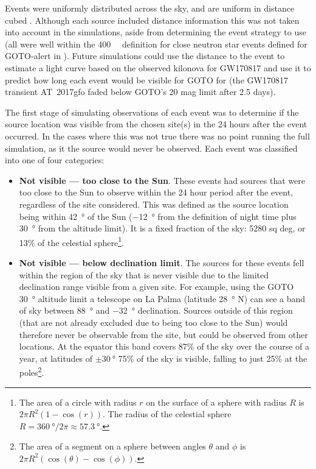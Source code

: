 \begin{colsection}
Events were uniformly distributed across the sky, and are uniform in distance cubed \citep{First2Years}. Although each source included distance information this was not taken into account in the simulations, aside from determining the event strategy to use (all were well within the \SI{400}{\mega\parsec} definition for close neutron star events defined for GOTO-alert in ). Future simulations could use the distance to the event to estimate a light curve based on the observed kilonova for GW170817 \citep{GW170817_followup} and use it to predict how long each event would be visible for GOTO for (the GW170817 transient AT~2017gfo faded below GOTO's 20 mag limit after 2.5 days).

\newpage

The first stage of simulating observations of each event was to determine if the source location was visible from the chosen site(s) in the 24 hours after the event occurred. In the cases where this was not true there was no point running the full simulation, as it the source would never be observed. Each event was classified into one of four categories: %

\begin{itemize}
    \item \textbf{Not visible --- too close to the Sun}. These events had sources that were too close to the Sun to observe within the 24 hour period after the event, regardless of the site considered. This was defined as the source location being within \SI{42}{\degree} of the Sun (\SI{-12}{\degree} from the definition of night time plus \SI{30}{\degree} from the altitude limit). It is a fixed fraction of the sky: 5280 sq deg, or 13\% of the celestial sphere\footnote{The area of a circle with radius $r$ on the surface of a sphere with radius $R$ is $2\pi R^2(1-\cos(r))$. The radius of the celestial sphere $R=\SI{360}{\degree}/2\pi \approx \SI{57.3}{\degree}$.}.

    \item \textbf{Not visible --- below declination limit}. The sources for these events fell within the region of the sky that is never visible due to the limited declination range visible from a given site. For example, using the GOTO \SI{30}{\degree} altitude limit a telescope on La Palma (latitude \SI{28}{\degree} N) can see a band of sky between \SI{+88}{\degree} and \SI{-32}{\degree} declination. Sources outside of this region (that are not already excluded due to being too close to the Sun) would therefore never be observable from the site, but could be observed from other locations. At the equator this band covers 87\% of the sky over the course of a year, at latitudes of $\pm \SI{30}{\degree}$ 75\% of the sky is visible, falling to just 25\% at the poles\footnote{The area of a segment on a sphere between angles $\theta$ and $\phi$ is $2 \pi R^2 (\cos(\theta)-\cos(\phi))$.}.


\end{itemize}
\end{colsection}
